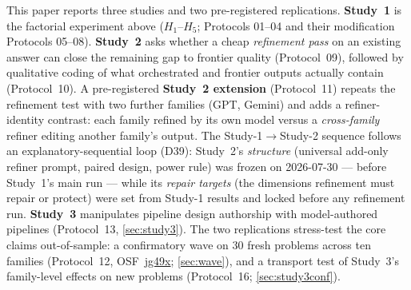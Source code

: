 \documentclass[12pt,a4paper]{article}
\begin{document}
This paper reports three studies and two pre-registered replications.
\textbf{Study~1} is the factorial experiment above ($H_1$--$H_5$; Protocols
01--04 and their modification Protocols 05--08). \textbf{Study~2} asks whether a cheap
\emph{refinement pass} on an existing answer can close the remaining gap to
frontier quality (Protocol~09), followed by qualitative coding of what
orchestrated and frontier outputs actually contain (Protocol~10). A
pre-registered \textbf{Study~2 extension} (Protocol~11) repeats the refinement
test with two further families (GPT, Gemini) and adds a refiner-identity
contrast: each family refined by its own model versus a \emph{cross-family}
refiner editing another family's output. The Study-1$\to$Study-2 sequence
follows an explanatory-sequential loop (D39): Study~2's \emph{structure}
(universal add-only refiner prompt, paired design, power rule) was frozen on
2026-07-30 --- before Study~1's main run --- while its \emph{repair targets}
(the dimensions refinement must repair or protect) were set from Study-1
results and locked before any refinement run. \textbf{Study~3}
manipulates pipeline design authorship with model-authored pipelines
(Protocol~13, \cref{sec:study3}). The two replications stress-test the core
claims out-of-sample: a confirmatory wave on 30 fresh problems across ten
families (Protocol~12, OSF~\href{https://osf.io/jg49x}{jg49x};
\cref{sec:wave}), and a transport test of Study~3's family-level effects on
new problems (Protocol~16; \cref{sec:study3conf}).
\end{document}
